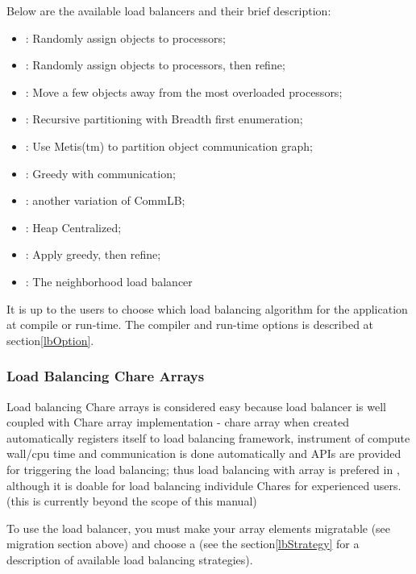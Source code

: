 Below are the available load balancers and their brief description:
\begin{itemize}
\item {}:   Randomly assign objects to processors;
\item {}:    Randomly assign objects to processors, then refine;
\item {}:     Move a few objects away from the most overloaded processors;
\item {}:        Recursive partitioning with Breadth first enumeration;
\item {}:      Use Metis(tm) to partition object communication graph;
\item {}:       Greedy with communication;
\item {}:      another variation of CommLB;
\item {}:   Heap Centralized;
\item {}:  Apply greedy, then refine;
\item {}:   The neighborhood load balancer
\end{itemize}

It is up to the users to choose which load balancing algorithm for the 
application at compile or run-time. The compiler and run-time options 
is described at section\ref{lbOption}.

\subsubsection{Load Balancing Chare Arrays}
\label{lbarray}

Load balancing Chare arrays is considered easy because
load balancer is well coupled with Chare array implementation - 
chare array when created automatically registers itself to load balancing
framework, instrument of compute wall/cpu time and communication is 
done automatically and APIs are provided for triggering the load balancing; 
thus load balancing with array is prefered in \charmpp{}, although it is doable 
for load balancing individule Chares for experienced users.(this is currently
beyond the scope of this manual)

To use the load balancer, you must make your array elements migratable
(see migration section above) and choose a  
(see the section\ref{lbStrategy} for a description
of available load balancing strategies).

